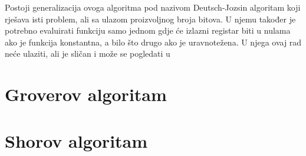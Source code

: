 Postoji generalizacija ovoga algoritma pod nazivom Deutsch-Jozsin algoritam koji rješava isti problem, ali sa ulazom proizvoljnog broja bitova. U njemu također je potrebno evaluirati funkciju samo jednom gdje će izlazni registar biti u nulama ako je funkcija konstantna, a bilo što drugo ako je uravnotežena. U njega ovaj rad neće ulaziti, ali je sličan i može se pogledati u \citep{nielsen2010quantum}

\section{Groverov algoritam}
\section{Shorov algoritam}